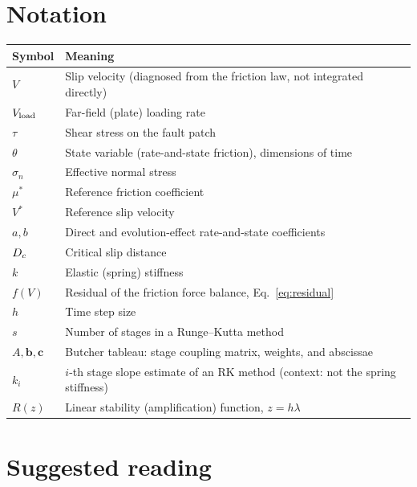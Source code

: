 \section{Notation}

\begin{center}
\begin{tabular}{@{}ll@{}}
\toprule
Symbol & Meaning \\
\midrule
$V$ & Slip velocity (diagnosed from the friction law, not integrated directly) \\
$V_{\mathrm{load}}$ & Far-field (plate) loading rate \\
$\tau$ & Shear stress on the fault patch \\
$\theta$ & State variable (rate-and-state friction), dimensions of time \\
$\sigma_n$ & Effective normal stress \\
$\mu^\ast$ & Reference friction coefficient \\
$V^\ast$ & Reference slip velocity \\
$a, b$ & Direct and evolution-effect rate-and-state coefficients \\
$D_c$ & Critical slip distance \\
$k$ & Elastic (spring) stiffness \\
$f(V)$ & Residual of the friction force balance, Eq.~\eqref{eq:residual} \\
$h$ & Time step size \\
$s$ & Number of stages in a Runge--Kutta method \\
$A, \mathbf b, \mathbf c$ & Butcher tableau: stage coupling matrix, weights, and abscissae \\
$k_i$ & $i$-th stage slope estimate of an RK method (context: not the spring stiffness) \\
$R(z)$ & Linear stability (amplification) function, $z = h\lambda$ \\
\bottomrule
\end{tabular}
\end{center}

\section{Suggested reading}

